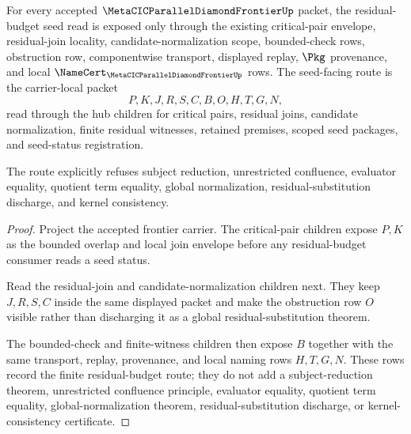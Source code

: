 \begin{theorem}
\label{thm:metacic-parallel-diamond-frontier-residual-budget-seed-status}
For every accepted $\MetaCICParallelDiamondFrontierUp$ packet, the residual-budget seed read is exposed only through the existing critical-pair envelope, residual-join locality, candidate-normalization scope, bounded-check rows, obstruction row, componentwise transport, displayed replay, $\Pkg$ provenance, and local $\NameCert_{\MetaCICParallelDiamondFrontierUp}$ rows. The seed-facing route is the carrier-local packet
$$
P,K,J,R,S,C,B,O,H,T,G,N ,
$$
read through the hub children for critical pairs, residual joins, candidate normalization, finite residual witnesses, retained premises, scoped seed packages, and seed-status registration.

The route explicitly refuses subject reduction, unrestricted confluence, evaluator equality, quotient term equality, global normalization, residual-substitution discharge, and kernel consistency.
\end{theorem}
\begin{proof}
Project the accepted frontier carrier. The critical-pair children expose $P,K$ as the bounded overlap and local join envelope before any residual-budget consumer reads a seed status.

Read the residual-join and candidate-normalization children next. They keep $J,R,S,C$ inside the same displayed packet and make the obstruction row $O$ visible rather than discharging it as a global residual-substitution theorem.

The bounded-check and finite-witness children then expose $B$ together with the same transport, replay, provenance, and local naming rows $H,T,G,N$. These rows record the finite residual-budget route; they do not add a subject-reduction theorem, unrestricted confluence principle, evaluator equality, quotient term equality, global-normalization theorem, residual-substitution discharge, or kernel-consistency certificate.
\end{proof}
